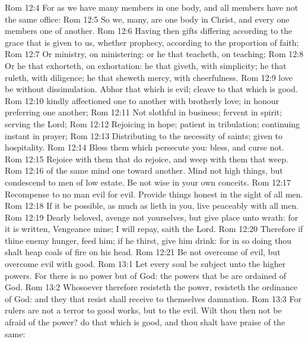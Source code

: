 \vs Rom 12:4 For as we have many members in one body, and all members have not the same office:
\vs Rom 12:5 So we,  many, are one body in Christ, and every one members one of another.
\vs Rom 12:6 Having then gifts differing according to the grace that is given to us, whether prophecy,  according to the proportion of faith;
\vs Rom 12:7 Or ministry,  on  ministering: or he that teacheth, on teaching;
\vs Rom 12:8 Or he that exhorteth, on exhortation: he that giveth,  with simplicity; he that ruleth, with diligence; he that sheweth mercy, with cheerfulness.
\vs Rom 12:9  love be without dissimulation. Abhor that which is evil; cleave to that which is good.
\vs Rom 12:10  kindly affectioned one to another with brotherly love; in honour preferring one another;
\vs Rom 12:11 Not slothful in business; fervent in spirit; serving the Lord;
\vs Rom 12:12 Rejoicing in hope; patient in tribulation; continuing instant in prayer;
\vs Rom 12:13 Distributing to the necessity of saints; given to hospitality.
\vs Rom 12:14 Bless them which persecute you: bless, and curse not.
\vs Rom 12:15 Rejoice with them that do rejoice, and weep with them that weep.
\vs Rom 12:16  of the same mind one toward another. Mind not high things, but condescend to men of low estate. Be not wise in your own conceits.
\vs Rom 12:17 Recompense to no man evil for evil. Provide things honest in the sight of all men.
\vs Rom 12:18 If it be possible, as much as lieth in you, live peaceably with all men.
\vs Rom 12:19 Dearly beloved, avenge not yourselves, but  give place unto wrath: for it is written, Vengeance  mine; I will repay, saith the Lord.
\vs Rom 12:20 Therefore if thine enemy hunger, feed him; if he thirst, give him drink: for in so doing thou shalt heap coals of fire on his head.
\vs Rom 12:21 Be not overcome of evil, but overcome evil with good.
\vs Rom 13:1 Let every soul be subject unto the higher powers. For there is no power but of God: the powers that be are ordained of God.
\vs Rom 13:2 Whosoever therefore resisteth the power, resisteth the ordinance of God: and they that resist shall receive to themselves damnation.
\vs Rom 13:3 For rulers are not a terror to good works, but to the evil. Wilt thou then not be afraid of the power? do that which is good, and thou shalt have praise of the same:
